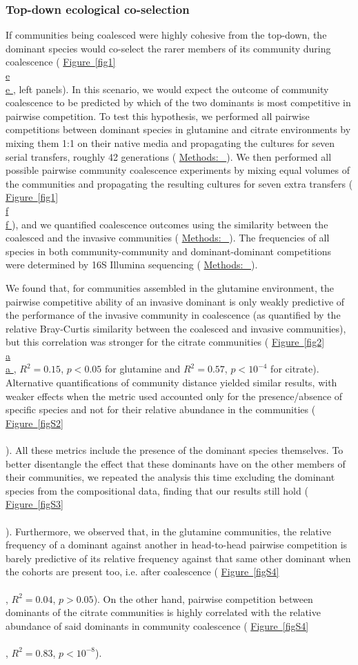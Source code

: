 \documentclass[a4paper,10pt]{article}
\newcommand{\figref}[2][]{%
  \hyperref[{#2}]{%
    Figure~\ref*{#2}%
    \ifx\\#1\\%
    \else
      #1%
    \fi
  }%
}
\newcommand{\methodsref}[1]{%
  \hyperref[{methods:#1}]{%
   Methods:~\nameref*{methods:#1}%
  }%
}
\begin{document}
\subsubsection*{Top-down ecological co-selection}

If communities being coalesced were highly cohesive from the top-down,
the dominant species would co-select the rarer members of its community during coalescence
(\figref[e]{fig1}, left panels).
In this scenario, we would expect the outcome of community coalescence to be predicted by
which of the two dominants is most competitive in pairwise competition.
To test this hypothesis, we performed all pairwise competitions between dominant species
in glutamine and citrate environments by mixing them 1:1 on their native media and propagating
the cultures for seven serial transfers, roughly 42 generations
(\methodsref{competitions}).
We then performed all possible pairwise community coalescence experiments by mixing
equal volumes of the communities and propagating the resulting cultures for seven extra
transfers
(\figref[f]{fig1}),
and we quantified coalescence outcomes using the similarity between the coalesced and the
invasive communities
(\methodsref{metrics}).
The frequencies of all species in both community-community and dominant-dominant competitions
were determined by 16S Illumina sequencing
(\methodsref{sequencing}).

We found that, for communities assembled in the glutamine environment,
the pairwise competitive ability of an invasive dominant
is only weakly predictive of the performance of the invasive community in coalescence
(as quantified by the relative Bray-Curtis similarity between the coalesced and invasive communities),
but this correlation was stronger for the citrate communities
(\figref[a]{fig2}, $R^2=0.15$, $p<0.05$ for glutamine and $R^2=0.57$, $p<10^{-4}$ for citrate).
Alternative quantifications of community distance yielded similar results,
with weaker effects when the metric used
accounted only for the presence/absence of specific species and not for their relative abundance in
the communities
(\figref{figS2}).
All these metrics include the presence of the dominant species themselves. To better disentangle the effect
that these dominants have on the other members of their communities, we repeated the analysis this time
excluding the dominant species from the compositional data, finding that our results still hold
(\figref{figS3}).
Furthermore, we observed that, in the glutamine communities,
the relative frequency of a dominant against another in head-to-head pairwise competition
is barely predictive of its relative frequency against that same other dominant when the
cohorts are present too, i.e. after coalescence
(\figref{figS4}, $R^2=0.04$, $p>0.05$).
On the other hand, pairwise competition between dominants of the citrate communities
is highly correlated with the relative abundance of said dominants in community coalescence
 (\figref{figS4}, $R^2=0.83$, $p<10^{-8}$).
\end{document}
